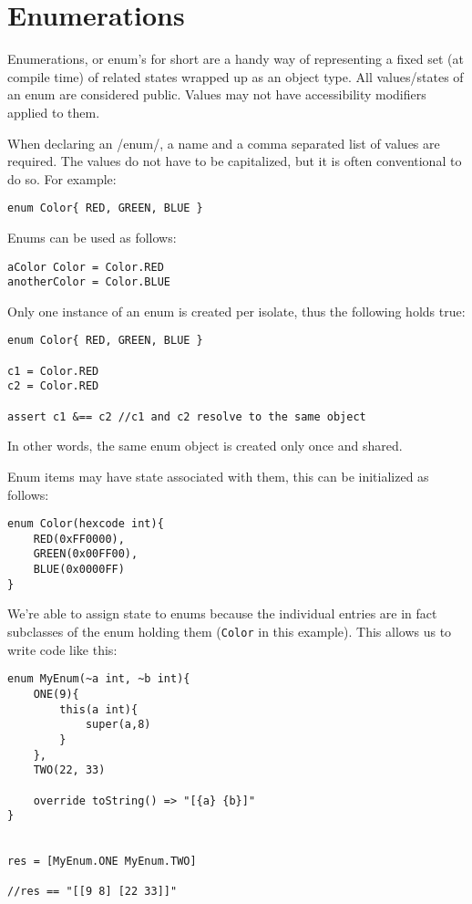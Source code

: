 \documentclass[conc-doc]{subfiles}
\begin{document}
	
	\chapter[Enumerations]{Enumerations}

Enumerations, or enum's for short are a handy way of representing a fixed set (at compile time) of related states wrapped up as an object type. All values/states of an enum are considered public. Values may not have accessibility modifiers applied to them.

When declaring an /enum/, a name and a comma separated list of values are required. The values do not have to be capitalized, but it is often conventional to do so. For example:

\begin{lstlisting}
enum Color{ RED, GREEN, BLUE }
\end{lstlisting}

Enums can be used as follows:
\begin{lstlisting}
aColor Color = Color.RED
anotherColor = Color.BLUE
\end{lstlisting}

Only one instance of an enum is created per isolate, thus the following holds true:

\begin{lstlisting}
enum Color{ RED, GREEN, BLUE }

c1 = Color.RED
c2 = Color.RED

assert c1 &== c2 //c1 and c2 resolve to the same object
\end{lstlisting}

In other words, the same enum object is created only once and shared.

Enum items may have state associated with them, this can be initialized as follows:

\begin{lstlisting}
enum Color(hexcode int){
	RED(0xFF0000), 
	GREEN(0x00FF00), 
	BLUE(0x0000FF) 
}
\end{lstlisting}

We're able to assign state to enums because the individual entries are in fact subclasses of the enum holding them (\lstinline{Color} in this example). This allows us to write code like this:
\begin{lstlisting}
enum MyEnum(~a int, ~b int){
	ONE(9){
		this(a int){
			super(a,8)
		}
	},
	TWO(22, 33)
	
	override toString() => "[{a} {b}]"
}


res = [MyEnum.ONE MyEnum.TWO]

//res == "[[9 8] [22 33]]"
\end{lstlisting}
\end{document}
